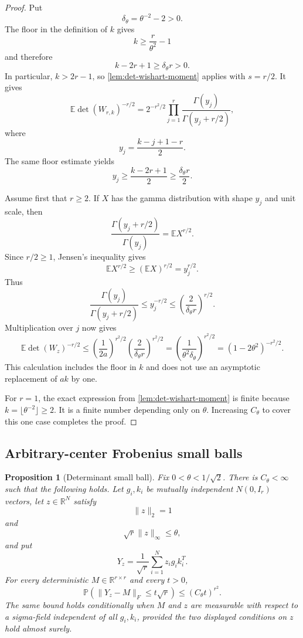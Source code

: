 \documentclass[11pt]{article}
\numberwithin{equation}{section}
\newtheorem{proposition}[theorem]{Proposition}
\theoremstyle{definition}
\theoremstyle{remark}
\newcommand{\R}{\mathbb R}
\newcommand{\E}{\mathbb E}
\newcommand{\Pp}{\mathbb P}
\newcommand{\1}{\boldsymbol 1}
\begin{document}
\begin{aiblock}
\begin{proof}
  Put
  \[
    \delta_\theta=\theta^{-2}-2>0.
  \]
  The floor in the definition of $k$ gives
  \[
    k\ge\frac r{\theta^2}-1
  \]
  and therefore
  \[
    k-2r+1\ge\delta_\theta r>0.
  \]
  In particular, $k>2r-1$, so
  \cref{lem:det-wishart-moment} applies with $s=r/2$. It
  gives
  \[
    \E\det(W_{r,k})^{-r/2}
    =2^{-r^2/2}\prod_{j=1}^r
    \frac{\Gamma(y_j)}{\Gamma(y_j+r/2)},
  \]
  where
  \[
    y_j=\frac{k-j+1-r}{2}.
  \]
  The same floor estimate yields
  \[
    y_j\ge\frac{k-2r+1}{2}\ge\frac{\delta_\theta r}{2}.
  \]

  Assume first that $r\ge2$. If $X$ has the gamma
  distribution with shape $y_j$ and unit scale, then
  \[
    \frac{\Gamma(y_j+r/2)}{\Gamma(y_j)}=\E X^{r/2}.
  \]
  Since $r/2\ge1$, Jensen's inequality gives
  \[
    \E X^{r/2}\ge(\E X)^{r/2}=y_j^{r/2}.
  \]
  Thus
  \[
    \frac{\Gamma(y_j)}{\Gamma(y_j+r/2)} \le
    y_j^{-r/2} \le \left(\frac2{\delta_\theta
    r}\right)^{r/2}.
  \]
  Multiplication over $j$ now gives
  \[
    \E\det(W_z)^{-r/2} \le
    \left(\frac1{2a}\right)^{r^2/2}
    \left(\frac2{\delta_\theta r}\right)^{r^2/2} =
    \left(\frac1{\theta^2\delta_\theta}\right)^{r^2/2} =
    (1-2\theta^2)^{-r^2/2}.
  \]
  This calculation includes the floor in $k$ and does not
  use an asymptotic replacement of $ak$ by one.

  For $r=1$, the exact expression from
  \cref{lem:det-wishart-moment} is finite because
  $k=\lfloor\theta^{-2}\rfloor\ge2$. It is a finite number
  depending only on $\theta$. Increasing $C_\theta$ to
  cover this one case completes the proof.
\end{proof}


\subsection{Arbitrary-center Frobenius small balls}

\begin{proposition}[Determinant small ball]
  \label{prop:det-frobenius-small-ball}
  Fix $0<\theta<1/\sqrt2$. There is $C_\theta<\infty$ such
  that the following holds. Let $g_i,k_i$ be mutually
  independent $N(0,I_r)$ vectors, let $z\in\R^N$ satisfy
  \[
    \|z\|_2=1
  \]
  and
  \[
    \sqrt r\|z\|_\infty\le\theta,
  \]
  and put
  \[
    Y_z=\frac1{\sqrt r}\sum_{i=1}^Nz_ig_ik_i^T.
  \]
  For every deterministic $M\in\R^{r\times r}$ and every
  $t>0$,
  \[
    \Pp(\|Y_z-M\|_F\le t\sqrt r) \le (C_\theta t)^{r^2}.
  \]
  The same bound holds conditionally when $M$ and $z$ are
  measurable with respect to a sigma-field independent of
  all $g_i,k_i$, provided the two displayed conditions on
  $z$ hold almost surely.
\end{proposition}


\end{aiblock}
\end{document}
